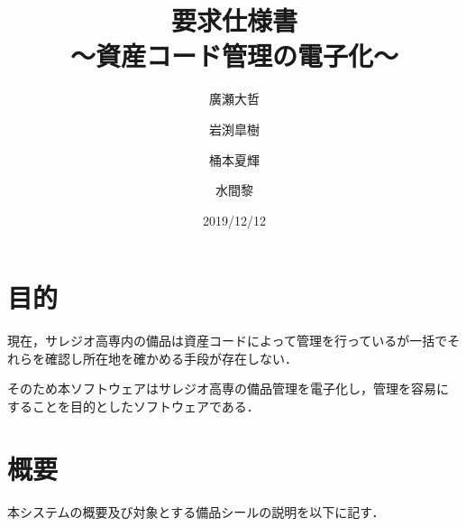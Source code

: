 \documentclass[11pt,a4j]{jarticle}
\title{要求仕様書\\～資産コード管理の電子化～}
\author{廣瀬大哲 \and 岩渕皐樹 \and 桶本夏輝 \and 水間黎}
\date{2019/12/12}
\begin{document}
  \maketitle
  \thispagestyle{empty}
  
  \newpage
  
   \tableofcontents
  \newpage
  \section{目的}
  現在，サレジオ高専内の備品は資産コードによって管理を行っているが一括でそれらを確認し所在地を確かめる手段が存在しない．
  
  そのため本ソフトウェアはサレジオ高専の備品管理を電子化し，管理を容易にすることを目的としたソフトウェアである．

  \section{概要}
  本システムの概要及び対象とする備品シールの説明を以下に記す．\par
  
\end{document}
